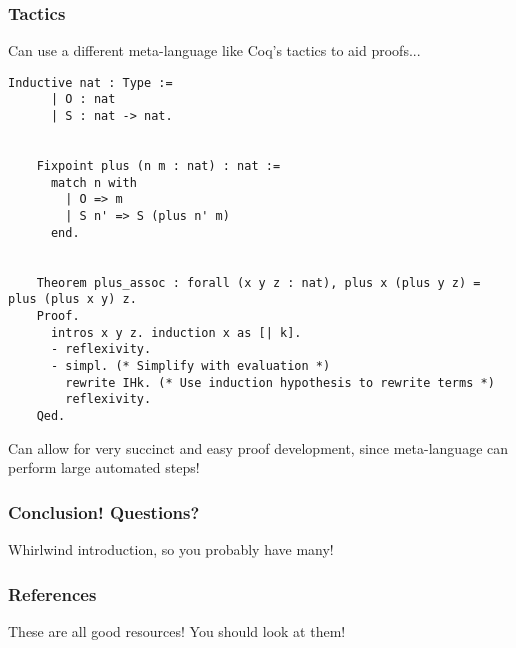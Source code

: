 \documentclass{beamer}
\begin{document}
\begin{frame}[fragile]
  \frametitle{Tactics}

  Can use a different meta-language like Coq's tactics to aid proofs...

  \pause
  \begin{lstlisting}[language=Coq]
    Inductive nat : Type :=
      | O : nat
      | S : nat -> nat.


    Fixpoint plus (n m : nat) : nat :=
      match n with
        | O => m
        | S n' => S (plus n' m)
      end.


    Theorem plus_assoc : forall (x y z : nat), plus x (plus y z) = plus (plus x y) z.
    Proof.
      intros x y z. induction x as [| k].
      - reflexivity.
      - simpl. (* Simplify with evaluation *)
        rewrite IHk. (* Use induction hypothesis to rewrite terms *)
        reflexivity.
    Qed.
  \end{lstlisting}

  \pause

  Can allow for very succinct and easy proof development, since meta-language can perform large automated steps!
\end{frame}

\begin{frame}
  \frametitle{Conclusion! Questions?}

  \huge{Whirlwind introduction, so you probably have many!}
\end{frame}

\begin{frame}
  \frametitle{References}

  \nocite{*}
  \printbibliography

  These are all good resources! You should look at them!
\end{frame}
\end{document}
